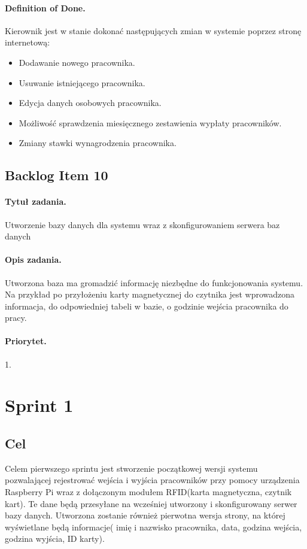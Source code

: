 \documentclass[a4paper]{article}
\begin{document}
\paragraph{Definition of Done.} Kierownik jest w stanie dokonać następujących zmian w systemie poprzez stronę internetową:
\begin{itemize}
\item Dodawanie nowego pracownika.
\item Usuwanie istniejącego pracownika.
\item Edycja danych osobowych pracownika.
\item Możliwość sprawdzenia miesięcznego zestawienia wypłaty pracowników.
\item Zmiany stawki wynagrodzenia pracownika.
\end {itemize}

\subsection{Backlog Item 10}
\paragraph{Tytuł zadania.} Utworzenie bazy danych dla systemu wraz z skonfigurowaniem serwera baz danych
\paragraph{Opis zadania.} Utworzona baza ma gromadzić informację niezbędne do funkcjonowania systemu. Na przykład po przyłożeniu karty magnetycznej do czytnika jest wprowadzona informacja, do odpowiedniej tabeli w bazie, o godzinie wejścia pracownika do pracy. 
\paragraph{Priorytet.} 1.


\section{Sprint 1}
\subsection{Cel} Celem pierwszego sprintu jest stworzenie początkowej wersji systemu pozwalającej rejestrować wejścia i wyjścia pracowników przy pomocy urządzenia Raspberry Pi wraz z dołączonym modułem RFID(karta magnetyczna, czytnik kart). Te dane będą przesyłane na wcześniej utworzony i skonfigurowany serwer bazy danych. Utworzona zostanie również pierwotna wersja strony, na której wyświetlane będą informacje( imię i nazwisko pracownika, data, godzina wejścia, godzina wyjścia, ID karty).
\end{document}
